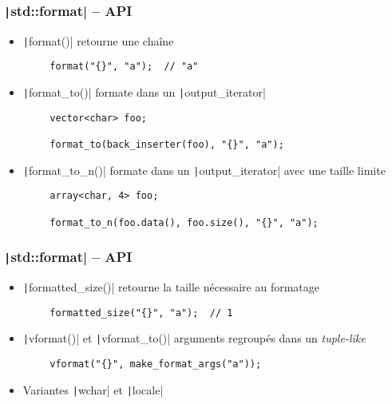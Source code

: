 \documentclass[C++.tex]{subfiles}
\begin{document}
\begin{frame}[fragile]
	\frametitle{\texttt|std::format| -- API}
	\begin{itemize}
		\item \texttt|format()| retourne une chaîne
	\end{itemize}

	\begin{verbatim}
		format("{}", "a");  // "a"
	\end{verbatim}

	\begin{itemize}
		\item \texttt|format_to()| formate dans un \texttt|output_iterator|
	\end{itemize}

	\begin{verbatim}
		vector<char> foo;

		format_to(back_inserter(foo), "{}", "a");
	\end{verbatim}


	\begin{itemize}
		\item \texttt|format_to_n()| formate dans un \texttt|output_iterator| avec une taille limite
	\end{itemize}

	\begin{verbatim}
		array<char, 4> foo;

		format_to_n(foo.data(), foo.size(), "{}", "a");
	\end{verbatim}

\end{frame}

\begin{frame}[fragile]
	\frametitle{\texttt|std::format| -- API}
	\begin{itemize}
		\item \texttt|formatted_size()| retourne la taille nécessaire au formatage
	\end{itemize}

	\begin{verbatim}
		formatted_size("{}", "a");  // 1
	\end{verbatim}

	\begin{itemize}
		\item \texttt|vformat()| et \texttt|vformat_to()| arguments regroupés dans un \textit{tuple-like}
	\end{itemize}

	\begin{verbatim}
		vformat("{}", make_format_args("a"));
	\end{verbatim}

	\begin{itemize}
		\item Variantes \texttt|wchar| et \texttt|locale|
	\end{itemize}
\end{frame}
\end{document}
